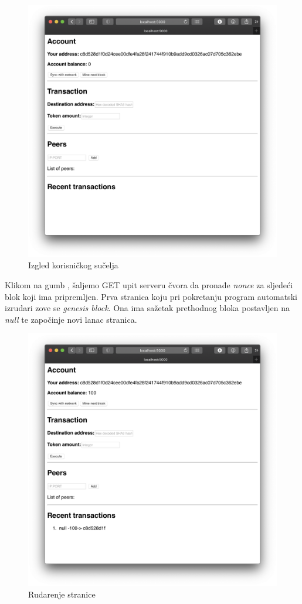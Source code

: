 \documentclass[utf8, zavrsni]{fer}
\begin{document}
\begin{figure}[H]
    \centering
    \includegraphics[width=\textwidth]{sucelje}
    \caption{Izgled korisničkog sučelja}
    \label{fig:sucelje}
\end{figure}

Klikom na gumb , šaljemo GET upit serveru čvora da pronađe \textit{nonce} za sljedeći blok koji ima pripremljen. Prva stranica koju pri pokretanju program automatski izrudari zove se \textit{genesis block}. Ona ima sažetak prethodnog bloka postavljen na \textit{null} te započinje novi lanac stranica.

\begin{figure}[H]
    \centering
    \includegraphics[width=\textwidth]{rudarenje}
    \caption{Rudarenje stranice}
    \label{fig:rudarenje}
\end{figure}
\end{document}
